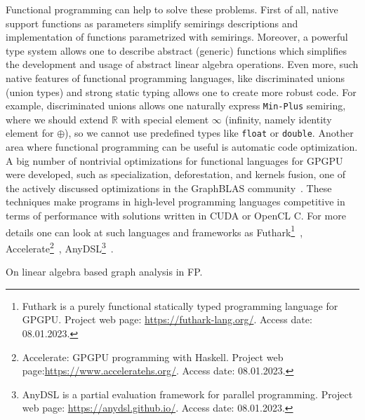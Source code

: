 Functional programming can help to solve these problems.
First of all, native support functions as parameters simplify semirings descriptions and implementation of functions parametrized with semirings.
Moreover, a powerful type system allows one to describe abstract (generic) functions which simplifies the development and usage of abstract linear algebra operations.
Even more, such native features of functional programming languages, like discriminated unions (union types) and strong static typing allows one to create more robust code.
For example, discriminated unions allows one naturally express \texttt{Min-Plus} semiring, where we should extend $\mathbb{R}$ with special element $\infty$ (infinity, namely identity element for $\oplus$), so we cannot use predefined types like \texttt{float} or \texttt{double}.
Another area where functional programming can be useful is automatic code optimization.
A big number of nontrivial optimizations for functional languages for GPGPU were developed, such as specialization, deforestation, and kernels fusion, one of the actively discussed optimizations in the GraphBLAS community~\cite{10.1145/3466795}.
These techniques make programs in high-level programming languages competitive in terms of performance with solutions written in CUDA or OpenCL C.
For more details one can look at such languages and frameworks as Futhark\footnote{Futhark is a purely functional statically typed programming language for GPGPU. Project web page: \url{https://futhark-lang.org/}. Access date: 08.01.2023.}~\cite{Henriksen:2017:FPF:3062341.3062354}, Accelerate\footnote{Accelerate: GPGPU programming with Haskell. Project web page:\url{https://www.acceleratehs.org/}. Access date: 08.01.2023.}~\cite{10.1145/2544174.2500595}, AnyDSL\footnote{AnyDSL is a partial evaluation framework for parallel programming. Project web page: \url{https://anydsl.github.io/}. Access date: 08.01.2023.}~\cite{10.1145/3276489}.

On linear algebra based graph analysis in FP. 

